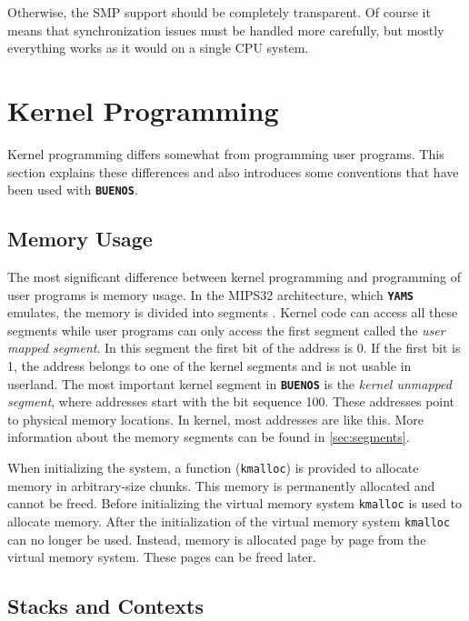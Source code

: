 \documentclass[twoside,a4paper]{report}
\newcommand{\buenos}{\texttt{\textbf{BUENOS}}}
\newcommand{\yams}{\texttt{\textbf{YAMS}}}
\begin{document}
Otherwise, the SMP support should be completely transparent. Of course
it means that synchronization issues must be handled more carefully,
but mostly everything works as it would on a single CPU system.

\section{Kernel Programming}


Kernel programming differs somewhat from programming user
programs. This section explains these differences and also introduces
some conventions that have been used with \buenos{}.

\subsection{Memory Usage}


The most significant difference between kernel programming and
programming of user programs is memory usage. In the MIPS32
architecture, which \yams{} emulates, the memory is divided into
segments . Kernel code
can access all these segments while user programs can only access the
first segment called the \emph{user mapped segment}. In this segment
the first bit of the address is 0. If the first bit is 1, the address
belongs to one of the kernel segments and is not usable in
userland. The most important kernel segment in \buenos{} is the
\emph{kernel unmapped segment}, where addresses start with the bit
sequence 100. These addresses point to physical memory locations. In
kernel, most addresses are like this.  More information about the
memory segments can be found in \autoref{sec:segments}.

When initializing the system, a function (\texttt{kmalloc})
 is provided to allocate memory in
arbitrary-size chunks. This memory is permanently allocated and cannot
be freed. Before initializing the virtual memory system
\texttt{kmalloc} is used to allocate memory. After the initialization
of the virtual memory system \texttt{kmalloc} can no longer be used.
Instead, memory is allocated page by page from the virtual memory
system. These pages can be freed later.

\subsection{Stacks and Contexts}
\end{document}
